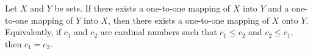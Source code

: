Let $X$ and $Y$ be sets. If there exists a one-to-one mapping of $X$ into $Y$ and a one-to-one mapping of $Y$ into $X$, then there exists a one-to-one mapping of $X$ onto $Y$. Equivalently, if $c_1$ and $c_2$ are cardinal numbers such that $c_1 \leq c_2$ and $c_2 \leq c_1$, then $c_1 = c_2$.

